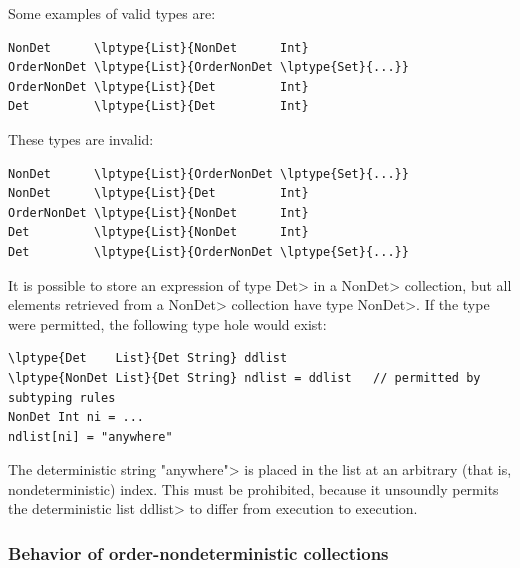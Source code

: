 \smallskip
\noindent
\begin{minipage}{.48\textwidth}
Some examples of valid types are:
\begin{Verbatim}[commandchars=\\\{\}]
NonDet      \lptype{List}{NonDet      Int}
OrderNonDet \lptype{List}{OrderNonDet \lptype{Set}{...}}
OrderNonDet \lptype{List}{Det         Int}
Det         \lptype{List}{Det         Int}

\end{Verbatim}
\end{minipage}
\hfill
\begin{minipage}{.46\textwidth}
These types are invalid:
\begin{smaller}
\begin{Verbatim}[commandchars=\\\{\}]
NonDet      \lptype{List}{OrderNonDet \lptype{Set}{...}}
NonDet      \lptype{List}{Det         Int}
OrderNonDet \lptype{List}{NonDet      Int}
Det         \lptype{List}{NonDet      Int}
Det         \lptype{List}{OrderNonDet \lptype{Set}{...}}
\end{Verbatim}
\end{smaller}
\end{minipage}
\smallskip


It is possible to store an expression of type \<Det> in a \<NonDet>
collection, but all elements retrieved from a \<NonDet> collection have
type \<NonDet>.  If the type  were
permitted, the following type hole would exist:

\begin{Verbatim}[commandchars=\\\{\}]
\lptype{Det    List}{Det String} ddlist
\lptype{NonDet List}{Det String} ndlist = ddlist   // permitted by subtyping rules
NonDet Int ni = ...
ndlist[ni] = "anywhere"
\end{Verbatim}

\noindent
The deterministic string \<"anywhere"> is placed in the list at an
arbitrary (that is, nondeterministic) index.  This must be prohibited,
because it unsoundly permits the deterministic list \<ddlist> to differ
from execution to execution.


\subsubsection{Behavior of order-nondeterministic collections}\label{sec:ond-behavior}

